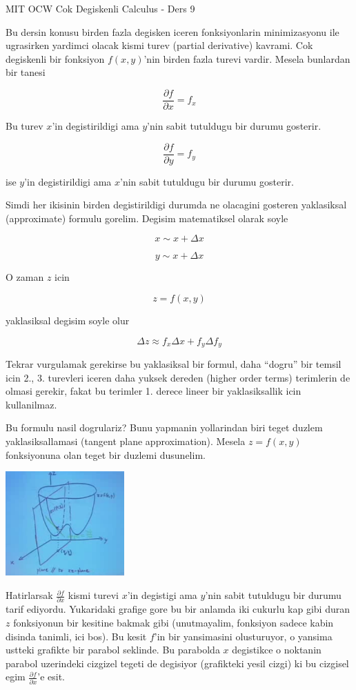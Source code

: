 \documentclass[12pt,fleqn]{article}
\begin{document}
MIT OCW Cok Degiskenli Calculus - Ders 9

Bu dersin konusu birden fazla degisken iceren fonksiyonlarin minimizasyonu
ile ugrasirken yardimci olacak kismi turev (partial derivative)
kavrami. Cok degiskenli bir fonksiyon $f(x,y)$'nin birden fazla turevi
vardir. Mesela bunlardan bir tanesi

\[ \frac{\partial f}{\partial x} = f_x \]

Bu turev $x$'in degistirildigi ama $y$'nin sabit tutuldugu bir durumu
gosterir. 

\[ \frac{\partial f}{\partial y} = f_y \]

ise $y$'in degistirildigi ama $x$'nin sabit tutuldugu bir durumu gosterir.

Simdi her ikisinin birden degistirildigi durumda ne olacagini gosteren
yaklasiksal (approximate) formulu gorelim. Degisim matematiksel olarak
soyle

\[ x \sim x + \Delta x \]

\[ y \sim x + \Delta x \]

O zaman $z$ icin

\[ z = f(x,y) \]

yaklasiksal degisim soyle olur

\begin{equation}\label{eq1}
\Delta z \approx f_x\Delta x + f_y \Delta f_y
\end{equation}


Tekrar vurgulamak gerekirse bu yaklasiksal bir formul, daha ``dogru'' bir
temsil icin 2., 3. turevleri iceren daha yuksek dereden (higher order
terms) terimlerin de olmasi gerekir, fakat bu terimler 1. derece lineer bir
yaklasiksallik icin kullanilmaz. 

Bu formulu nasil dogrulariz? Bunu yapmanin yollarindan biri teget duzlem
yaklasiksallamasi (tangent plane approximation). Mesela $z = f(x,y)$
fonksiyonuna olan teget bir duzlemi dusunelim.

\includegraphics[height=4cm]{9_1.png}

Hatirlarsak $\frac{\partial f}{\partial x}$ kismi turevi $x$'in degistigi
ama $y$'nin sabit tutuldugu bir durumu tarif ediyordu. Yukaridaki grafige
gore bu bir anlamda iki cukurlu kap gibi duran $z$ fonksiyonun bir kesitine
bakmak gibi (unutmayalim, fonksiyon sadece kabin disinda tanimli, ici
bos). Bu kesit $f$'in bir yansimasini olusturuyor, o yansima ustteki
grafikte bir parabol seklinde. Bu parabolda $x$ degistikce o noktanin
parabol uzerindeki cizgizel tegeti de degisiyor (grafikteki yesil cizgi) ki
bu cizgisel egim $\frac{\partial f}{\partial x}$'e esit. 
\end{document}
